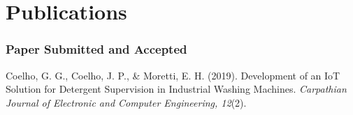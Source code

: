 \chapter{Publications}\label{apendice3}

\subsection*{Paper Submitted and Accepted}

Coelho, G. G., Coelho, J. P., \& Moretti, E. H. (2019). Development of an IoT Solution for Detergent Supervision in Industrial Washing Machines. \textit{Carpathian Journal of Electronic and Computer Engineering, 12}(2).
